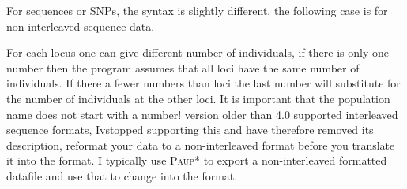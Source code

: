 \par
For sequences or SNPs, the syntax is slightly different, the following case 
is for non-interleaved sequence data.
 \begin{small}
\end{small}
For each locus one can give different number of individuals, if there is only one number then the program assumes that all loci have the same number of individuals. If there a fewer numbers than loci
the last number will substitute for the number of individuals at the other loci. It is important that the population name does not start with a number!
\smallskip
\migrate version older than 4.0 supported interleaved sequence formats, Ivstopped supporting this and have therefore removed its description, reformat your data to a non-interleaved format before you translate it into the \migrate format. I typically use \textsc{Paup*} \cite{swofford2003} to export a non-interleaved \phylip formatted datafile and use that to change into the \migrate format.
